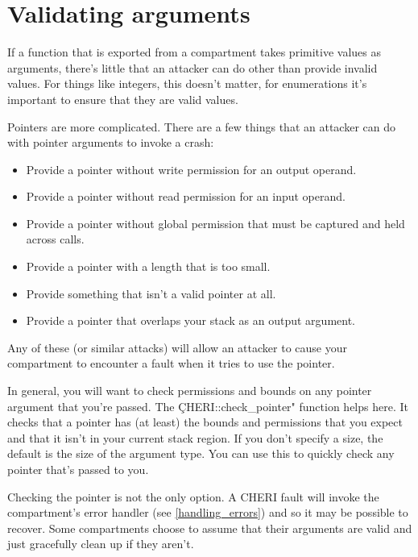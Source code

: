 \section{Validating arguments}

If a function that is exported from a compartment takes primitive values as arguments, there's little that an attacker can do other than provide invalid values.
For things like integers, this doesn't matter, for enumerations it's important to ensure that they are valid values.

Pointers are more complicated.
There are a few things that an attacker can do with pointer arguments to invoke a crash:

\begin{itemize}
	\item{Provide a pointer without write permission for an output operand.}
	\item{Provide a pointer without read permission for an input operand.}
	\item{Provide a pointer without global permission that must be captured and held across calls.}
	\item{Provide a pointer with a length that is too small.}
	\item{Provide something that isn't a valid pointer at all.}
	\item{Provide a pointer that overlaps your stack as an output argument.}
\end{itemize}

Any of these (or similar attacks) will allow an attacker to cause your compartment to encounter a fault when it tries to use the pointer.

In general, you will want to check permissions and bounds on any pointer argument that you're passed.
The \c{CHERI::check_pointer"} function helps here.
It checks that a pointer has (at least) the bounds and permissions that you expect and that it isn't in your current stack region.
If you don't specify a size, the default is the size of the argument type.
You can use this to quickly check any pointer that's passed to you.


\begin{note}
Checking the pointer is not the only option.
A CHERI fault will invoke the compartment's error handler (see \ref{handling_errors}) and so it may be possible to recover.
Some compartments choose to assume that their arguments are valid and just gracefully clean up if they aren't.
\end{note}

